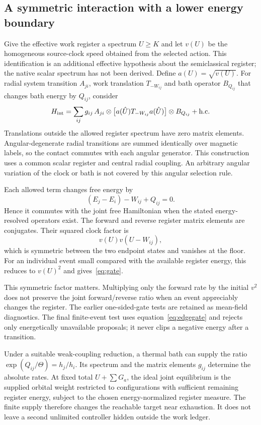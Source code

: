 \documentclass[11pt]{article}
\begin{document}
\subsection{A symmetric interaction with a lower energy boundary}
Give the effective work register a spectrum $U\ge K$ and let $v(U)$ be
the homogeneous source-clock speed obtained from the selected action.
This identification is an additional effective hypothesis about the
semiclassical register; the native scalar spectrum has not been derived.
Define $a(U)=\sqrt{v(U)}$. For radial system transition $A_{ji}$, work
translation $T_{-W_{ij}}$ and bath operator $B_{Q_{ij}}$ that changes bath
energy by $Q_{ij}$, consider
\begin{equation}\label{eq:Hint}
 H_{\rm int}=\sum_{ij}g_{ij}\,
 A_{ji}\otimes\bigl[a(\hat U)T_{-W_{ij}}a(\hat U)\bigr]
 \otimes B_{Q_{ij}}+\text{h.c.}
\end{equation}
Translations outside the allowed register spectrum have zero matrix
elements. Angular-degenerate radial transitions are summed identically
over magnetic labels, so the contact commutes with each angular generator.
This construction uses a common scalar register and central radial coupling.
An arbitrary angular variation of the clock or bath is not covered by this
angular selection rule.

Each allowed term changes free energy by
\begin{equation}
 (E_j-E_i)-W_{ij}+Q_{ij}=0.
\end{equation}
Hence it commutes with the joint free Hamiltonian when the stated
energy-resolved operators exist. The forward and reverse register matrix
elements are conjugates. Their squared clock factor is
\begin{equation}\label{eq:edgegate}
 v(U)v(U-W_{ij}),
\end{equation}
which is symmetric between the two endpoint states and vanishes at the
floor. For an individual event small compared with the available register
energy, this reduces to $v(U)^2$ and gives~\eqref{eq:gate}.

This symmetric factor matters. Multiplying only the forward rate by the
initial $v^2$ does not preserve the joint forward/reverse ratio when an
event appreciably changes the register. The earlier one-sided-gate tests
are retained as mean-field diagnostics. The final finite-event test uses
equation~\eqref{eq:edgegate} and rejects only energetically unavailable
proposals; it never clips a negative energy after a transition.

Under a suitable weak-coupling reduction, a thermal bath can supply the
ratio $\exp(Q_{ij}/\Theta)=h_j/h_i$. Its spectrum and the matrix elements
$g_{ij}$ determine the absolute rates. At fixed total $U+\sum G_a$, the
ideal joint equilibrium is the supplied orbital weight restricted to
configurations with sufficient remaining register energy, subject to the
chosen energy-normalized register measure. The finite supply therefore
changes the reachable target near exhaustion. It does not leave a second
unlimited controller hidden outside the work ledger.
\end{document}
